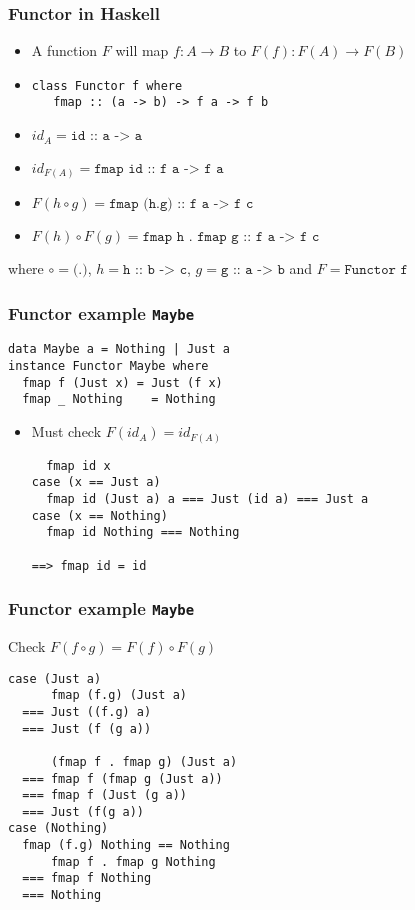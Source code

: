\documentclass{beamer} %
\begin{document}
\begin{frame}[fragile]\frametitle{Functor in Haskell}
  \begin{itemize}
    \item A function $F$ will map $f : A \rightarrow B$ to $F(f) : F(A) \rightarrow F(B)$
     
    \item 
\begin{verbatim}
class Functor f where
   fmap :: (a -> b) -> f a -> f b
\end{verbatim}

  \item $id_A = \texttt{id :: a -> a}$

  \item $id_{F(A)} = \texttt{fmap id :: f a -> f a}$ 

  \item $F(h\circ g) = \texttt{fmap (h.g) :: f a -> f c}$

  \item $F(h) \circ F(g) = \texttt{fmap h . fmap g :: f a -> f c}$
  \end{itemize}
  where $\circ = \texttt{(.)}$, $h = \texttt{h :: b -> c}$,  $g = \texttt{g :: a -> b}$ and
  $F = \texttt{Functor f}$
\end{frame}

\begin{frame}[fragile]\frametitle{Functor example \texttt{Maybe}}
\begin{verbatim}
data Maybe a = Nothing | Just a
instance Functor Maybe where
  fmap f (Just x) = Just (f x)
  fmap _ Nothing    = Nothing
\end{verbatim}
\begin{itemize}
  \item Must check $F(id_A) = id_{F(A)}$
\begin{verbatim}
  fmap id x
case (x == Just a)
  fmap id (Just a) a === Just (id a) === Just a
case (x == Nothing)
  fmap id Nothing === Nothing

==> fmap id = id
\end{verbatim}
\end{itemize}
\end{frame}

\begin{frame}[fragile]\frametitle{Functor example \texttt{Maybe}}
Check $F(f \circ g) = F(f) \circ F(g)$
\begin{verbatim}
case (Just a)
      fmap (f.g) (Just a) 
  === Just ((f.g) a)
  === Just (f (g a))

      (fmap f . fmap g) (Just a) 
  === fmap f (fmap g (Just a)) 
  === fmap f (Just (g a))
  === Just (f(g a))
case (Nothing)
  fmap (f.g) Nothing == Nothing
      fmap f . fmap g Nothing 
  === fmap f Nothing
  === Nothing
\end{verbatim}
\end{frame}
\end{document}
